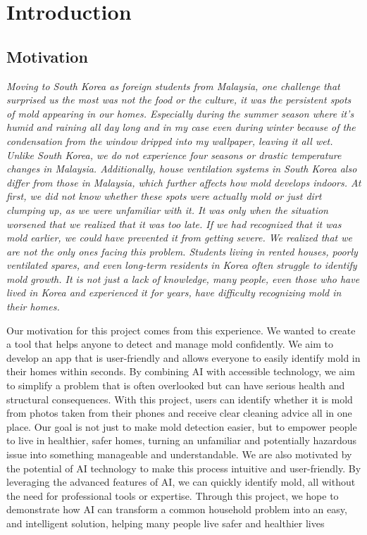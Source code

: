 \documentclass[conference]{IEEEtran}
\begin{document}
\section{Introduction}
\subsection{Motivation}

{\it Moving to South Korea as foreign students from Malaysia, one challenge that surprised us the most was not the food or the culture, it was the persistent spots of mold appearing in our homes. Especially during the summer season where it’s humid and raining all day long and in my case even during winter because of the condensation from the window dripped into my wallpaper, leaving it all wet. Unlike South Korea, we do not experience four seasons or drastic temperature changes in Malaysia. Additionally, house ventilation systems in South Korea also differ from those in Malaysia, which further affects how mold develops indoors. At first, we did not know whether these spots were actually mold or just dirt clumping up, as we were unfamiliar with it. It was only when the situation worsened that we realized that it was too late. If we had recognized that it was mold earlier, we could have prevented it from getting severe. We realized that we are not the only ones facing this problem. Students living in rented houses, poorly ventilated spares, and even long-term residents in Korea often struggle to identify mold growth. It is not just a lack of knowledge, many people, even those who have lived in Korea and experienced it for years, have difficulty recognizing mold in their homes.

Our motivation for this project comes from this experience. We wanted to create a tool that helps anyone to detect and manage mold confidently. We aim to develop an app that is user-friendly and allows everyone to easily identify mold in their homes within seconds. By combining AI with accessible technology, we aim to simplify a problem that is often overlooked but can have serious health and structural consequences. With this project, users can identify whether it is mold from photos taken from their phones and receive clear cleaning advice all in one place. Our goal is not just to make mold detection easier, but to empower people to live in healthier, safer homes, turning an unfamiliar and potentially hazardous issue into something manageable and understandable. We are also motivated by the potential of AI technology to make this process intuitive and user-friendly. By leveraging the advanced features of AI, we can quickly identify mold, all without the need for professional tools or expertise. Through this project, we hope to demonstrate how AI can transform a common household problem into an easy, and intelligent solution, helping many people live safer and healthier lives}
\end{document}
